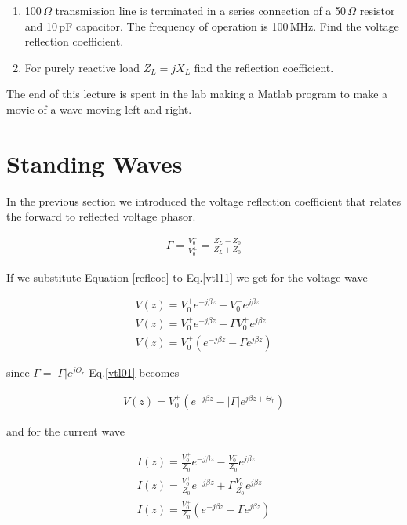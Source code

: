 \documentclass{ximera}
\begin{document}
 \begin{enumerate}
\item 100\,$\Omega$ transmission line is terminated in a series
connection of a 50\,$\Omega$ resistor and 10\,pF capacitor. The frequency
of operation is 100\,MHz. Find the voltage reflection coefficient.
\item For purely reactive load $Z_L=j X_L$ find the reflection
coefficient.
\end{enumerate}

The end of this lecture is spent in the lab making a Matlab program to
make a movie of a wave moving left and right.


\section{Standing Waves}


In the previous section we introduced the voltage reflection
coefficient that relates the forward to reflected voltage phasor.


\begin{eqnarray}
\Gamma = \frac{V_0^-}{V_0^+} = \frac{Z_L -Z_0}{Z_L +Z_0} \label{reflcoe}
\end{eqnarray}


If we substitute Equation \ref{reflcoe} to Eq.\ref{vtl11} we get for the voltage wave


\begin{eqnarray}
V(z) = V_0^+ e^{-j \beta z} +V_0^- e^{j \beta z} \label{vtl11}\\
V(z) = V_0^+ e^{-j \beta z} + \Gamma  V_0^+ e^{j \beta z} \nonumber
\\
V(z)= V_0^+ (e^{-j \beta z} - \Gamma  e^{j \beta z}  ) \label{vtl01}
\end{eqnarray}

since $\Gamma = |\Gamma| e^{j \Theta_r}$ Eq.\ref{vtl01} becomes


\begin{eqnarray}
V(z)= V_0^+ (e^{-j \beta z} - |\Gamma|  e^{j \beta z + \Theta_r}  ) \label{vtl011}
\end{eqnarray}



and for the current wave



\begin{eqnarray}
I(z) = \frac{V_0^+}{Z_0} e^{-j \beta z} -  \frac{V_0^-}{Z_0} e^{j \beta z} \label{ctl1}\\
I(z) =  \frac{V_0^+}{Z_0}  e^{-j \beta z} + \Gamma \frac{V_0^+}{Z_0}  e^{j \beta z} \nonumber
\\
I(z)=   \frac{V_0^+}{Z_0}  (e^{-j \beta z} - \Gamma  e^{j \beta z}  ) \label{ctl01}
\end{eqnarray}
\end{document}
